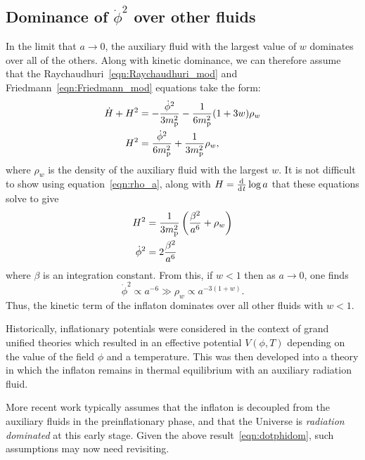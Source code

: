 \subsection{Dominance of $\dot{\phi}^2$ over other fluids}
\label{sec:dominance_fluids}
In the limit that $a\to 0$, the auxiliary fluid with the largest value of $w$ dominates over all of the others. Along with kinetic dominance, we can therefore assume that the Raychaudhuri~\eqref{eqn:Raychaudhuri_mod} and Friedmann~\eqref{eqn:Friedmann_mod} equations take the form:
%
\begin{align}
  \dot{H}+H^2 
  &= 
  -\frac{\dot{\phi}^2}{3m_{\mathrm{p}}^2} - \frac{1}{6m_{\mathrm{p}}^2}(1+3w)\rho_w
  \label{eqn:Ray_KD_eq_rho}
  \\
  H^2 
  &= 
  \frac{\dot{\phi}^2}{6m_{\mathrm{p}}^2} +  \frac{1}{3m_{\mathrm{p}}^2}\rho_w,
  \label{eqn:Friedmann_KD_eq_rho}
\end{align}
where $\rho_w$ is the density of the auxiliary fluid with the largest $w$.  It is not difficult to show using equation~\eqref{eqn:rho_a},
along with $H=\frac{\operatorname{d}^{}\!{}}{\operatorname{d}^{}\!{t}}\log a$ that these equations solve to give
%
\begin{align}
  H^2 
  &= 
  \frac{1}{3m_{\mathrm{p}}^2}\left(\frac{\beta^2}{a^6} + \rho_w\right) 
  \label{eqn:H_of_a_1}
  \\
  \dot{\phi}^2 
  &= 
  2\frac{\beta^2}{a^6} 
  \label{eqn:dotphi_of_a_1}
\end{align}
%
where $\beta$ is an integration constant. From this, if $w<1$ then as
$a\to 0$, one finds
%
\begin{equation}
  \dot{\phi}^2 \propto a^{-6} 
  \gg
  \rho_w \propto a^{-3(1+w)}.
  \label{eqn:dotphidom}
\end{equation}
%
Thus, the kinetic term of the inflaton dominates over all other fluids with $w<1$.




Historically, inflationary potentials were considered in the context of grand unified theories \citep{PhysRevLett.48.1220,linde_1982} which resulted in an effective potential $V(\phi,T)$ depending on the value of the field $\phi$ and a temperature.  This was then developed \citep{1995PhRvL..74.1912B,PhysRevLett.75.3218} into a theory in which the inflaton remains in thermal equilibrium with an auxiliary radiation fluid.

More recent work \citep{2007PhRvD..76f3512P} typically assumes that the inflaton is decoupled from the auxiliary fluids in the preinflationary phase, and that the Universe is {\em radiation dominated\/} at this early stage. Given the above result~\eqref{eqn:dotphidom}, such assumptions may now need revisiting.



